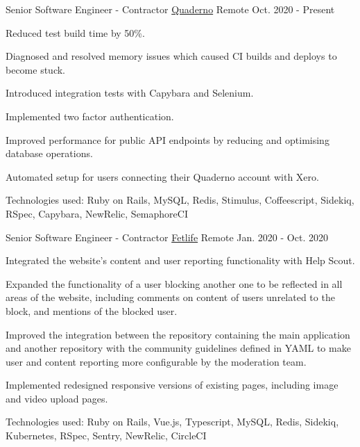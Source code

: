 \documentclass[11pt, a4paper]{awesome-cv}
\begin{document}
\begin{cventries}


  \cventry
    {Senior Software Engineer - Contractor} %
    {\href{https://quaderno.io/}{Quaderno}} %
    {Remote} %
    {Oct. 2020 - Present}
    {
      \begin{cvitems} %
        \item {Reduced test build time by 50\%.}
        \item {Diagnosed and resolved memory issues which caused CI builds and deploys to become stuck.}
        \item {Introduced integration tests with Capybara and Selenium.}
        \item {Implemented two factor authentication.}
        \item {Improved performance for public API endpoints by reducing and optimising database operations.}
        \item {Automated setup for users connecting their Quaderno account with Xero.}
        \item {Technologies used: Ruby on Rails, MySQL, Redis, Stimulus, Coffeescript, Sidekiq, RSpec, Capybara, NewRelic, SemaphoreCI}
      \end{cvitems}
    }

  \cventry
    {Senior Software Engineer - Contractor} %
    {\href{https://www.fetlife.com/}{Fetlife}} %
    {Remote} %
    {Jan. 2020 - Oct. 2020}
    {
      \begin{cvitems} %
        \item {Integrated the website's content and user reporting functionality with Help Scout.}
        \item {Expanded the functionality of a user blocking another one to be reflected in all areas of the website, including comments on content of users unrelated to the block, and mentions of the blocked user.}
        \item {Improved the integration between the repository containing the main application and another repository with the community guidelines defined in YAML to make user and content reporting more configurable by the moderation team.}
        \item {Implemented redesigned responsive versions of existing pages, including image and video upload pages.}
        \item {Technologies used: Ruby on Rails, Vue.js, Typescript, MySQL, Redis, Sidekiq, Kubernetes, RSpec, Sentry, NewRelic, CircleCI}
      \end{cvitems}
    }


\end{cventries}
\end{document}
